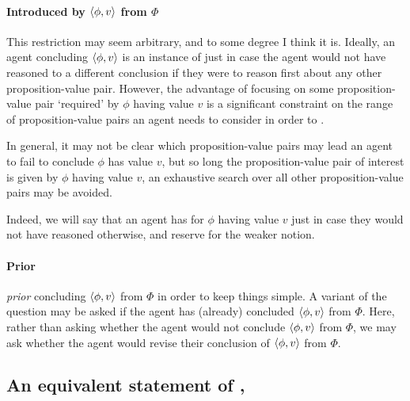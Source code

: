 \paragraph*{Introduced by \(\langle \phi, v \rangle\) from \(\Phi\)}

\begin{note}
  This restriction may seem arbitrary, and to some degree I think it is.
  Ideally, an agent concluding \(\langle \phi, v \rangle\) is an instance of \csN{} just in case the agent would not have reasoned to a different conclusion if they were to reason first about any other proposition-value pair.
  However, the advantage of focusing on some proposition-value pair `required' by \(\phi\) having value \(v\) is a significant constraint on the range of proposition-value pairs an agent needs to consider in order to \csN{}.

  In general, it may not be clear which proposition-value pairs may lead an agent to fail to conclude \(\phi\) has value \(v\), but so long the proposition-value pair of interest is given by \(\phi\) having value \(v\), an exhaustive search over all other proposition-value pairs may be avoided.

  Indeed, we will say that an agent has \emph{\support{}} for \(\phi\) having value \(v\) just in case they would not have reasoned otherwise, and reserve \emph{\claiming{}} \support{} for the weaker notion.
\end{note}



\paragraph*{Prior}

\begin{note}
  \emph{prior} concluding \(\langle \phi, v \rangle\) from \(\Phi\) in order to keep things simple.
  A variant of the question may be asked if the agent has (already) concluded \(\langle \phi, v \rangle\) from \(\Phi\).
  Here, rather than asking whether the agent would not conclude \(\langle \phi, v \rangle\) from \(\Phi\), we may ask whether the agent would revise their conclusion of \(\langle \phi, v \rangle\) from \(\Phi\).
\end{note}

\subsection{An equivalent statement of \zs{}, \Zs{}}
\label{sec:overview:an-equiv-stat-of-zs}

